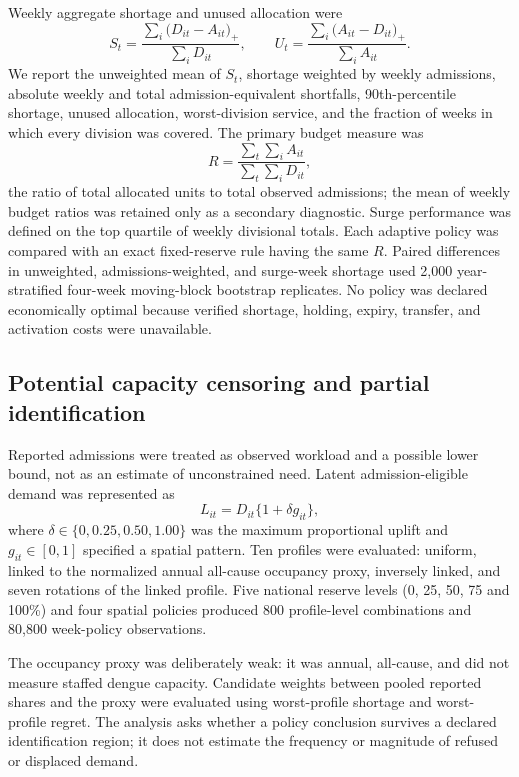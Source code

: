 \documentclass[11pt]{article}
\begin{document}
Weekly aggregate shortage and unused allocation were
\begin{equation}
S_t=\frac{\sum_i\bigl(D_{it}-A_{it}\bigr)_{+}}{\sum_i D_{it}},
\qquad
U_t=\frac{\sum_i\bigl(A_{it}-D_{it}\bigr)_{+}}{\sum_i A_{it}}.
\end{equation}
We report the unweighted mean of $S_t$, shortage weighted by weekly admissions, absolute weekly and total admission-equivalent shortfalls, 90th-percentile shortage, unused allocation, worst-division service, and the fraction of weeks in which every division was covered. The primary budget measure was
\begin{equation}
R=\frac{\sum_t\sum_i A_{it}}{\sum_t\sum_i D_{it}},
\end{equation}
the ratio of total allocated units to total observed admissions; the mean of weekly budget ratios was retained only as a secondary diagnostic. Surge performance was defined on the top quartile of weekly divisional totals. Each adaptive policy was compared with an exact fixed-reserve rule having the same $R$. Paired differences in unweighted, admissions-weighted, and surge-week shortage used 2,000 year-stratified four-week moving-block bootstrap replicates. No policy was declared economically optimal because verified shortage, holding, expiry, transfer, and activation costs were unavailable.

\subsection{Potential capacity censoring and partial identification}

Reported admissions were treated as observed workload and a possible lower bound, not as an estimate of unconstrained need. Latent admission-eligible demand was represented as
\begin{equation}
L_{it}=D_{it}\{1+\delta g_{it}\},
\end{equation}
where $\delta\in\{0,0.25,0.50,1.00\}$ was the maximum proportional uplift and $g_{it}\in[0,1]$ specified a spatial pattern. Ten profiles were evaluated: uniform, linked to the normalized annual all-cause occupancy proxy, inversely linked, and seven rotations of the linked profile. Five national reserve levels (0, 25, 50, 75 and 100\%) and four spatial policies produced 800 profile-level combinations and 80,800 week-policy observations.

The occupancy proxy was deliberately weak: it was annual, all-cause, and did not measure staffed dengue capacity. Candidate weights between pooled reported shares and the proxy were evaluated using worst-profile shortage and worst-profile regret. The analysis asks whether a policy conclusion survives a declared identification region; it does not estimate the frequency or magnitude of refused or displaced demand.
\end{document}
